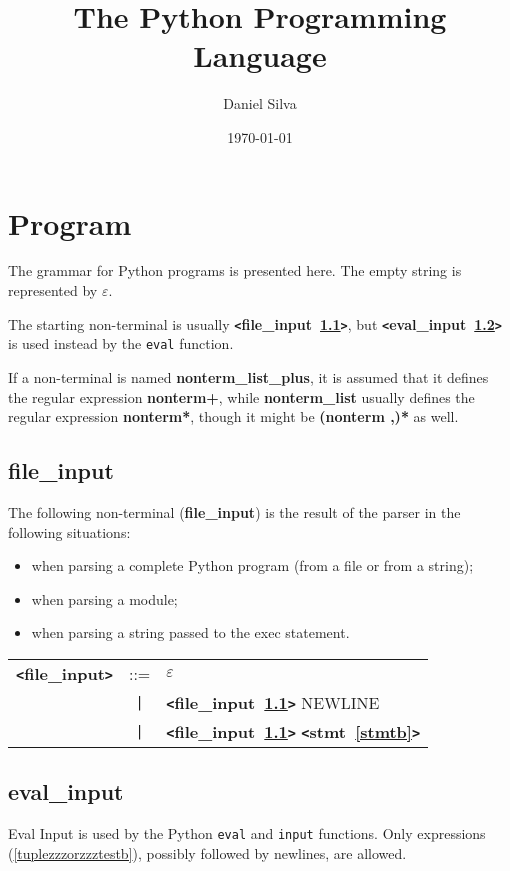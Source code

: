 \documentclass[12pt]{article}
\title{The Python Programming Language}
\author{Daniel Silva}
\date{\today}
\begin{document}
\maketitle
\tableofcontents
\newpage

\section{Program}

The grammar for Python programs is presented here.  The empty string is represented by $\varepsilon$.

The starting non-terminal is usually {\bf \verb+<+file\_input~\ref{filezzzinputb}\verb+>+}, but {\bf \verb+<+eval\_input~\ref{evalzzzinputb}\verb+>+} is used instead by the \verb|eval| function.

If a non-terminal is named {\bf nonterm\_list\_plus}, it is assumed that it defines the regular expression {\bf nonterm+}, while {\bf nonterm\_list} usually defines the regular expression {\bf nonterm*}, though it might be {\bf (nonterm ,)*} as well.

\subsection{file\_input}
\label{filezzzinputb}
The following non-terminal ({\bf file\_{}input}) is the result of the parser in the following situations:
\begin{itemize}
\item when parsing a complete Python program (from a file or from a string);
\item when parsing a module;
\item when parsing a string passed to the exec statement.
\end{itemize}

\begin{tabular}{lcl}
{\bf \verb+<+file\_input\verb+>+} & ::=  & $\varepsilon$ \\
 & \verb+|+  & {\bf \verb+<+file\_input~\ref{filezzzinputb}\verb+>+}  NEWLINE \\
 & \verb+|+  & {\bf \verb+<+file\_input~\ref{filezzzinputb}\verb+>+}  {\bf \verb+<+stmt~\ref{stmtb}\verb+>+}  \\
\end{tabular}

\subsection{eval\_input}
\label{evalzzzinputb}
Eval Input is used by the Python \verb+eval+ and \verb+input+ functions.  Only expressions (\ref{tuplezzzorzzztestb}), possibly followed by newlines, are allowed. \\
\end{document}
